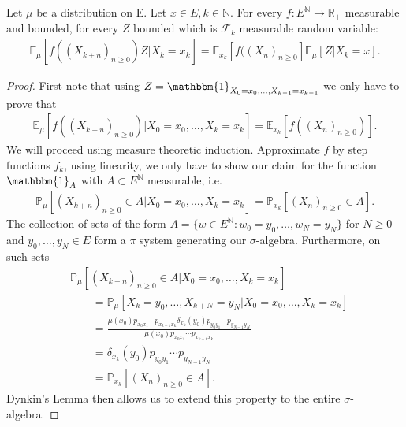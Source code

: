 \begin{theorem}
	Let $\mu$ be a distribution on E. Let $x \in E, k \in \mathbb{N}$. For every $f: E^{\mathbb{N}} \to \mathbb{R}_+$ measurable and bounded, for every $Z$ bounded which is $ \mathcal{F}_k$ measurable random variable:
\begin{align}
	\boxed{	\mathbb{E}_\mu \left[ f((X_{k+n})_{n \geq 0})Z | X_k = x_k \right] = \mathbb{E}_{x_k} \left[ f((X_n)_{n \geq 0} \right] \mathbb{E}_\mu \left[ Z | X_k=x \right].} 
\end{align}
\end{theorem}
\begin{proof}
	First note that using $Z= \mathbbm{1}_{X_0=x_0, \ldots ,X_{k-1}=x_{k-1}}$ we only have to prove that 
\begin{align}
	\mathbb{E}_{\mu } \left[ f((X_{k+n})_{n\geq 0}) | X_0=x_0 , \ldots , X_k=x_k \right]= \mathbb{E}_{x_k} \left[ f((X_n)_{n\geq 0}) \right]
.\end{align}
We will proceed using {\color{blue} measure theoretic} induction. Approximate $f$ by step functions $f_k$, using linearity, we only have to show our claim for the function $\mathbbm{1}_{A} $ with $A \subset E ^{\mathbb{N}}$ measurable, i.e. 
	\begin{align}
	\mathbb{P}_{\mu } \left[ (X_{k+n})_{n\geq 0}\in A | X_0=x_0, \ldots ,X_k=x_k \right] = \mathbb{P}_{x_k} \left[ (X_n)_{n\geq 0} \in A \right] 
.\end{align}  
The collection of sets of the form $A=\{w \in E^{\mathbb{N}}: w_0=y_0, \ldots ,w_N=y_N\}$ for $N\geq 0$ and $y_0, \ldots ,y_N \in E$ form a $\pi $ system generating our $\sigma$-algebra. Furthermore, on such sets 
\begin{align}
&	\mathbb{P}_{\mu } \left[ (X_{k+n})_{n\geq 0}\in A | X_0 = x_0, \ldots ,X_k=x_k \right] \\
&\qquad= \mathbb{P}_{\mu} \left[ X_k=y_0, \ldots ,X_{k+N}= y_N | X_0=x_0, \ldots ,X_k=x_k  \right] \\
&\qquad= \frac{\mu (x_0) p_{x_0x_1} \cdots p_{x_{k-1}x_k} \delta_{x_k}(y_0)p_{y_0y_1} \cdots p_{y_{N-1}y_N}}{\mu (x_0) p_{x_0x_1} \cdots p_{x_{k-1}x_k} } \\
& \qquad= \delta_{x_k}(y_0)p_{y_0y_1} \cdots p_{y_{N-1}y_N} \\
& \qquad= \mathbb{P}_{x_k} \left[ (X_n)_{n\geq 0} \in A \right] 
.\end{align}
Dynkin's Lemma then allows us to extend this property to the entire $\sigma$-algebra.
\end{proof}


